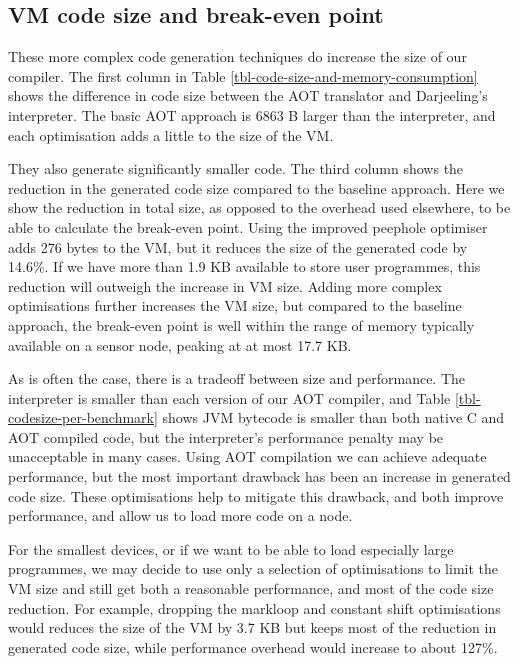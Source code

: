 \subsection{VM code size and break-even point}
These more complex code generation techniques do increase the size of our compiler. The first column in Table \ref{tbl-code-size-and-memory-consumption} shows the difference in code size between the AOT translator and Darjeeling's interpreter. The basic AOT approach is 6863 B larger than the interpreter, and each optimisation adds a little to the size of the VM.

They also generate significantly smaller code. The third column shows the reduction in the generated code size compared to the baseline approach. Here we show the reduction in total size, as opposed to the overhead used elsewhere, to be able to calculate the break-even point. Using the improved peephole optimiser adds 276 bytes to the VM, but it reduces the size of the generated code by 14.6\%. If we have more than 1.9 KB available to store user programmes, this reduction will outweigh the increase in VM size. Adding more complex optimisations further increases the VM size, but compared to the baseline approach, the break-even point is well within the range of memory typically available on a sensor node, peaking at at most 17.7 KB.

As is often the case, there is a tradeoff between size and performance. The interpreter is smaller than each version of our AOT compiler, and Table \ref{tbl-codesize-per-benchmark} shows JVM bytecode is smaller than both native C and AOT compiled code, but the interpreter's performance penalty may be unacceptable in many cases. Using AOT compilation we can achieve adequate performance, but the most important drawback has been an increase in generated code size. These optimisations help to mitigate this drawback, and both improve performance, and allow us to load more code on a node.

For the smallest devices, or if we want to be able to load especially large programmes, we may decide to use only a selection of optimisations to limit the VM size and still get both a reasonable performance, and most of the code size reduction. For example, dropping the markloop and constant shift optimisations would reduces the size of the VM by 3.7 KB but keeps most of the reduction in generated code size, while performance overhead would increase to about 127\%.



